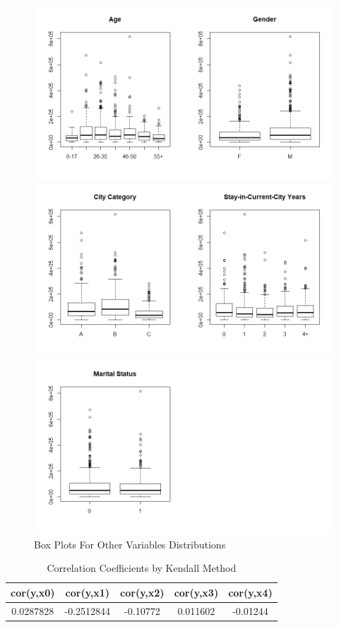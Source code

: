 \documentclass{zjureport}
\begin{document}
\begin{figure}[H]
	\centering
	\includegraphics[width=1\textwidth,height=.45\linewidth]{Rplot07.png}

	\centering
	\includegraphics[width=1\textwidth,height=.45\linewidth]{Rplot08.png}

	\centering
	\includegraphics[width=1\textwidth,height=.45\linewidth]{Rplot09.png}
	\caption{Box Plots For Other Variables Distributions}
\end{figure}

\begin{table}[htbp]
	\centering
	\caption{Correlation Coefficients by Kendall Method}
	\begin{tabular}{ccccc}
			\toprule[1.5pt]
		cor(y,x0) & cor(y,x1) & cor(y,x2) & cor(y,x3) & cor(y,x4) \\
		\toprule[1.5pt]
		0.0287828 & -0.2512844 & -0.10772 & 0.011602 & -0.01244 \\
		\toprule[1.5pt]
	\end{tabular}%
	\label{tab:addlabel}%
\end{table}%
\end{document}
